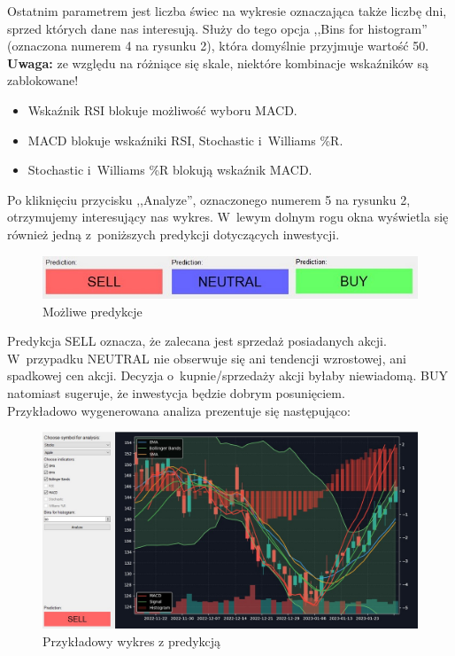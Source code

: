 \documentclass[12pt]{article}
\begin{document}
    Ostatnim parametrem jest liczba świec na wykresie oznaczająca także liczbę dni, sprzed których dane nas interesują.
	Służy do tego opcja ,,Bins for histogram'' (oznaczona numerem 4 na rysunku 2), która domyślnie przyjmuje wartość 50.\\

    \textbf{Uwaga:} ze względu na różniące się skale, niektóre kombinacje wskaźników są zablokowane!

    \begin{itemize}
        \item Wskaźnik RSI blokuje możliwość wyboru MACD\@.
        \item MACD blokuje wskaźniki RSI, Stochastic i~Williams \%R\@.
        \item Stochastic i~Williams \%R blokują wskaźnik MACD\@.
    \end{itemize}

    Po kliknięciu przycisku ,,Analyze'', oznaczonego numerem 5 na rysunku 2,
	otrzymujemy interesujący nas wykres.
	W~lewym dolnym rogu okna wyświetla się również jedną z~poniższych predykcji dotyczących inwestycji.

    \begin{figure}[H]
        \centering
        \includegraphics[scale=0.5]{pics/predykcje}
        \caption{Możliwe predykcje}\label{fig:figure5}
	\end{figure}

    Predykcja SELL oznacza, że zalecana jest sprzedaż posiadanych akcji.
	W~przypadku NEUTRAL nie obserwuje się ani tendencji wzrostowej, ani spadkowej cen akcji.
	Decyzja o~kupnie/sprzedaży akcji byłaby niewiadomą.
	BUY natomiast sugeruje, że inwestycja będzie dobrym posunięciem.\\

    \newpage
    Przykładowo wygenerowana analiza prezentuje się następująco:

    \begin{figure}[H]
        \centering
        \includegraphics[scale=0.4]{pics/wykres}
        \caption{Przykładowy wykres z predykcją}\label{fig:figure6}
	\end{figure}
\end{document}
